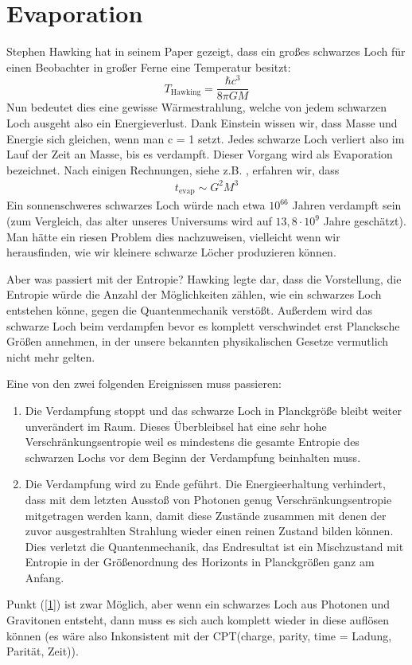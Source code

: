 \documentclass[ngerman]{scrartcl}
\begin{document}
\FloatBarrier
\section{Evaporation \checkmark} \label{evaporation}
Stephen Hawking hat in seinem Paper \cite{ParticleCreation} gezeigt, dass ein großes schwarzes Loch für einen Beobachter in großer Ferne eine Temperatur besitzt:
	\begin{equation}\label{HawkingTemp} 
		T_{\text{Hawking}} = \frac{\hbar c^3}{8 \pi GM}
	\end{equation}
Nun bedeutet dies eine gewisse Wärmestrahlung, welche von jedem schwarzen Loch ausgeht also ein Energieverlust. Dank Einstein wissen wir, dass Masse und Energie sich gleichen, wenn man c = 1 setzt. Jedes schwarze Loch verliert also im Lauf der Zeit an Masse, bis es verdampft. Dieser Vorgang wird als Evaporation bezeichnet. Nach einigen Rechnungen, siehe z.B. \cite{JerusalemsLectures}, erfahren wir, dass
	\begin{align}
		t_{\text{evap}} \sim G^2 M^3
	\end{align} 
Ein sonnenschweres schwarzes Loch würde nach etwa $10^{66}$ Jahren verdampft sein (zum Vergleich, das alter unseres Universums wird auf $13,8 \cdot 10^{9}$ Jahre geschätzt). Man hätte ein riesen Problem dies nachzuweisen, vielleicht wenn wir herausfinden, wie wir kleinere schwarze Löcher produzieren können. 

Aber was passiert mit der Entropie?
Hawking \cite{BreakdownGravitationalCollapse} legte dar, dass die Vorstellung, die Entropie würde die Anzahl der Möglichkeiten zählen, wie ein schwarzes Loch entstehen könne, gegen die Quantenmechanik verstößt.
Außerdem wird das schwarze Loch beim verdampfen bevor es komplett verschwindet erst Plancksche Größen annehmen, in der unsere bekannten physikalischen Gesetze vermutlich nicht mehr gelten. 

Eine von den zwei folgenden Ereignissen muss passieren:
	\begin{enumerate}[(1)]
		\item Die Verdampfung stoppt und das schwarze Loch in Planckgröße bleibt weiter unverändert im Raum. Dieses Überbleibsel hat eine sehr hohe Verschränkungsentropie weil es mindestens die gesamte Entropie des schwarzen Lochs vor dem Beginn der Verdampfung beinhalten muss. \label{1}
		
		\item Die Verdampfung wird zu Ende geführt. Die Energieerhaltung verhindert, dass mit dem letzten Ausstoß von Photonen genug Verschränkungsentropie mitgetragen werden kann, damit diese Zustände zusammen mit denen der zuvor ausgestrahlten Strahlung wieder einen reinen Zustand bilden können. Dies verletzt die Quantenmechanik, das Endresultat ist ein Mischzustand mit Entropie in der Größenordnung des Horizonts in Planckgrößen ganz am Anfang.  \label{2}
	\end{enumerate}
Punkt (\ref{1}) ist zwar Möglich, aber wenn ein schwarzes Loch aus Photonen und Gravitonen entsteht, dann muss es sich auch komplett wieder in diese auflösen können (es wäre also Inkonsistent mit der CPT(charge, parity, time = Ladung, Parität, Zeit)).
\end{document}
